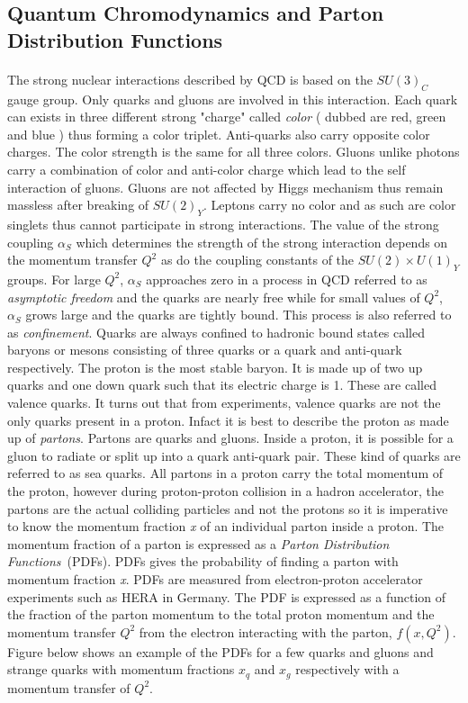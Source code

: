 \subsection*{Quantum Chromodynamics and Parton Distribution Functions}
\paragraph*{}
The strong nuclear interactions described by QCD is based on the $SU(3)_{C}$ gauge group. Only quarks and gluons are involved in this interaction. Each quark can exists in three different strong "charge" called \textit{color} ( dubbed are red, green and blue ) thus forming a color triplet. Anti-quarks also carry opposite color charges. The color strength is the same for all three colors. Gluons unlike photons carry a combination of color and anti-color charge which lead to the self interaction of gluons. Gluons are not affected by Higgs mechanism thus remain massless after breaking of $SU(2)_{Y}$. Leptons carry no color and as such are color singlets thus cannot participate in strong interactions.
\newline
The value of the strong coupling $\alpha_{S}$ which determines the strength of the strong interaction depends on the momentum transfer $Q^{2}$ as do the coupling constants of the $SU(2) \times U(1)_{Y}$ groups. For large $Q^{2}$, $\alpha_{S}$ approaches zero in a process in QCD referred  to as \textit{asymptotic freedom} and the quarks are nearly free while for small values of $Q^{2}$, $\alpha_{S}$ grows large and the quarks are tightly bound. This process is also referred to as \textit{confinement}.
Quarks are always confined to hadronic bound states called baryons or mesons consisting of three quarks or a quark and anti-quark respectively.
\newline
The proton is the most stable baryon. It is made up of two up quarks and one down quark such that its electric charge is 1. These are called valence quarks. It turns out that from experiments, valence quarks are not the only quarks present in a proton. Infact it is best to describe the proton as made up of \textit{partons}. Partons are quarks and gluons. Inside a proton, it is possible for a gluon to radiate or split up into a quark anti-quark pair. These kind of quarks are referred to as sea quarks. All partons in a proton carry the total momentum of the proton, however during proton-proton collision in a hadron accelerator, the partons are the actual colliding particles and not the protons so it is imperative to know the momentum fraction \textit{x} of an individual parton inside a proton. The momentum fraction of a parton is expressed as a \textit{Parton Distribution Functions}~(PDFs). PDFs gives the probability of finding a parton with momentum fraction \textit{x}. PDFs are measured from electron-proton accelerator experiments such as HERA in Germany.
The PDF is expressed as a function of the fraction of the parton momentum to the total proton momentum and the momentum transfer $Q^{2}$ from the electron interacting with the parton,   $f(x,Q^{2})$.
Figure below shows an example of the PDFs for a few quarks and gluons and strange quarks with momentum fractions  $x_{q}$ and $x_{g}$ respectively with a momentum transfer of $Q^{2}$.

